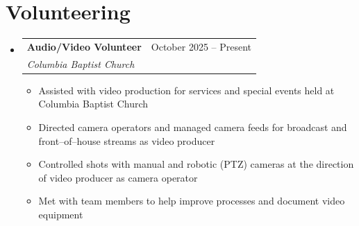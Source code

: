 \documentclass[letterpaper,11pt]{article}
\makeatletter
\newcommand{\resumeItem}[1]{
  \item\small{
    {#1 \vspace{-2pt}}
  }
}
\newcommand{\resumeEmploymentHeading}[3]{
    \item
    \begin{tabular*}{0.97\textwidth}{l@{\extracolsep{\fill}}r}
      \textbf{\small#1} & #3 \\
      \textit{\small#2} \\
    \end{tabular*}\vspace{-7pt}
}
\newcommand{\resumeSubHeadingListStart}{\begin{itemize}[leftmargin=0.15in, label={}]}
\newcommand{\resumeSubHeadingListEnd}{\end{itemize}}
\newcommand{\resumeItemListStart}{\begin{itemize}}
\newcommand{\resumeItemListEnd}{\end{itemize}\vspace{-5pt}}
\makeatother
\begin{document}
\section{Volunteering}
    \resumeSubHeadingListStart
      \resumeEmploymentHeading
          {Audio/Video Volunteer}{Columbia Baptist Church}{October 2025 -- Present}
          \resumeItemListStart
            \resumeItem{Assisted with video production for services and special events held at Columbia Baptist Church}
            \resumeItem{Directed camera operators and managed camera feeds for broadcast and front--of--house streams as video producer}
            \resumeItem{Controlled shots with manual and robotic (PTZ) cameras at the direction of video producer as camera operator}
            \resumeItem{Met with team members to help improve processes and document video equipment}
          \resumeItemListEnd
    \resumeSubHeadingListEnd

\end{document}
